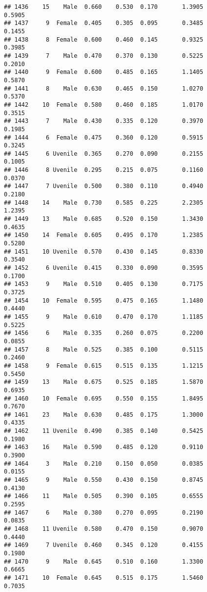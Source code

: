 \documentclass[
]{article}
\begin{document}
\begin{verbatim}
## 1436    15    Male  0.660    0.530  0.170       1.3905         0.5905
## 1437     9  Female  0.405    0.305  0.095       0.3485         0.1455
## 1438     8  Female  0.600    0.460  0.145       0.9325         0.3985
## 1439     7    Male  0.470    0.370  0.130       0.5225         0.2010
## 1440     9  Female  0.600    0.485  0.165       1.1405         0.5870
## 1441     8    Male  0.630    0.465  0.150       1.0270         0.5370
## 1442    10  Female  0.580    0.460  0.185       1.0170         0.3515
## 1443     7    Male  0.430    0.335  0.120       0.3970         0.1985
## 1444     6  Female  0.475    0.360  0.120       0.5915         0.3245
## 1445     6 Uvenile  0.365    0.270  0.090       0.2155         0.1005
## 1446     8 Uvenile  0.295    0.215  0.075       0.1160         0.0370
## 1447     7 Uvenile  0.500    0.380  0.110       0.4940         0.2180
## 1448    14    Male  0.730    0.585  0.225       2.2305         1.2395
## 1449    13    Male  0.685    0.520  0.150       1.3430         0.4635
## 1450    14  Female  0.605    0.495  0.170       1.2385         0.5280
## 1451    10 Uvenile  0.570    0.430  0.145       0.8330         0.3540
## 1452     6 Uvenile  0.415    0.330  0.090       0.3595         0.1700
## 1453     9    Male  0.510    0.405  0.130       0.7175         0.3725
## 1454    10  Female  0.595    0.475  0.165       1.1480         0.4440
## 1455     9    Male  0.610    0.470  0.170       1.1185         0.5225
## 1456     6    Male  0.335    0.260  0.075       0.2200         0.0855
## 1457     8    Male  0.525    0.385  0.100       0.5115         0.2460
## 1458     9  Female  0.615    0.515  0.135       1.1215         0.5450
## 1459    13    Male  0.675    0.525  0.185       1.5870         0.6935
## 1460    10  Female  0.695    0.550  0.155       1.8495         0.7670
## 1461    23    Male  0.630    0.485  0.175       1.3000         0.4335
## 1462    11 Uvenile  0.490    0.385  0.140       0.5425         0.1980
## 1463    16    Male  0.590    0.485  0.120       0.9110         0.3900
## 1464     3    Male  0.210    0.150  0.050       0.0385         0.0155
## 1465     9    Male  0.550    0.430  0.150       0.8745         0.4130
## 1466    11    Male  0.505    0.390  0.105       0.6555         0.2595
## 1467     6    Male  0.380    0.270  0.095       0.2190         0.0835
## 1468    11 Uvenile  0.580    0.470  0.150       0.9070         0.4440
## 1469     7 Uvenile  0.460    0.345  0.120       0.4155         0.1980
## 1470     9    Male  0.645    0.510  0.160       1.3300         0.6665
## 1471    10  Female  0.645    0.515  0.175       1.5460         0.7035

\end{verbatim}
\end{document}
